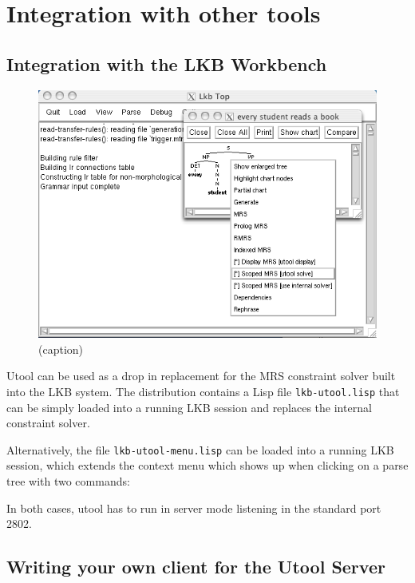 \section{Integration with other tools}
\label{sec:integration}


\subsection{Integration with the LKB Workbench}
\label{sec:integration-lkb}

\begin{figure}
\includegraphics{lkb-integration}
\caption{(caption)}
\label{fig:lkb-integration}
\end{figure}

Utool can be used as a drop in replacement for the MRS constraint
solver built into the LKB system. The distribution contains a Lisp
file \verb|lkb-utool.lisp| that can be simply loaded into a running
LKB session and replaces the internal constraint solver.

Alternatively, the file \verb|lkb-utool-menu.lisp| can be loaded into
a running LKB session, which extends the context menu which shows up
when clicking on a parse tree with two commands:

In both cases, utool has to run in server mode listening in the
standard port 2802.

\subsection{Writing your own client for the Utool Server}

